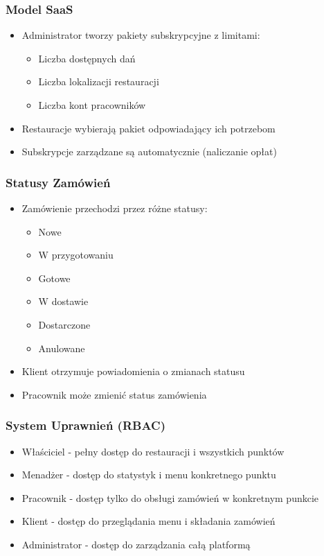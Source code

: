 ﻿\documentclass[12pt,a4paper,utf-8]{article}
\begin{document}
\subsubsection{Model SaaS}

\begin{itemize}
    \item Administrator tworzy pakiety subskrypcyjne z limitami:
    \begin{itemize}
        \item Liczba dostępnych dań
        \item Liczba lokalizacji restauracji
        \item Liczba kont pracowników
    \end{itemize}
    \item Restauracje wybierają pakiet odpowiadający ich potrzebom
    \item Subskrypcje zarządzane są automatycznie (naliczanie opłat)
\end{itemize}

\subsubsection{Statusy Zamówień}

\begin{itemize}
    \item Zamówienie przechodzi przez różne statusy:
    \begin{itemize}
        \item Nowe
        \item W przygotowaniu
        \item Gotowe
        \item W dostawie
        \item Dostarczone
        \item Anulowane
    \end{itemize}
    \item Klient otrzymuje powiadomienia o zmianach statusu
    \item Pracownik może zmienić status zamówienia
\end{itemize}

\subsubsection{System Uprawnień (RBAC)}

\begin{itemize}
    \item Właściciel - pełny dostęp do restauracji i wszystkich punktów
    \item Menadżer - dostęp do statystyk i menu konkretnego punktu
    \item Pracownik - dostęp tylko do obsługi zamówień w konkretnym punkcie
    \item Klient - dostęp do przeglądania menu i składania zamówień
    \item Administrator - dostęp do zarządzania całą platformą
\end{itemize}
\end{document}
